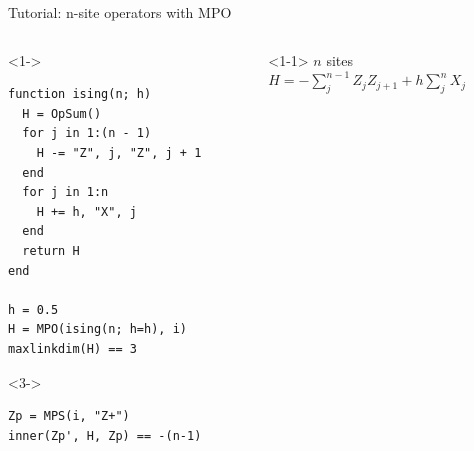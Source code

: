 \begin{frame}[fragile]{Tutorial: n-site operators with MPO}

\begin{columns}

\begin{column}{5cm}

\begin{onlyenv}<1->
\begin{lstlisting}[language=JuliaLocal, style=julia, mathescape, basicstyle=\scriptsize\ttfamily]
function ising(n; h)
  H = OpSum()
  for j in 1:(n - 1)
    H -= "Z", j, "Z", j + 1
  end
  for j in 1:n
    H += h, "X", j
  end
  return H
end

h = 0.5
H = MPO(ising(n; h=h), i)
maxlinkdim(H) == 3
\end{lstlisting}
\end{onlyenv}

\begin{onlyenv}<3->
\begin{lstlisting}[language=JuliaLocal, style=julia, mathescape, basicstyle=\scriptsize\ttfamily]
Zp = MPS(i, "Z+")
inner(Zp', H, Zp) == -(n-1)
 \end{lstlisting}
\end{onlyenv}

\end{column}

\begin{column}{5.5cm}

\begin{onlyenv}<1-1>
$n$ sites \\
$H = -\sum_j^{n-1} Z_j Z_{j+1} + h \sum_j^n X_j$ \\
~\\
~\\
~\\
~\\
~\\
~\\
~\\
~\\
\end{onlyenv}


\end{column}
\end{columns}
\end{frame}
